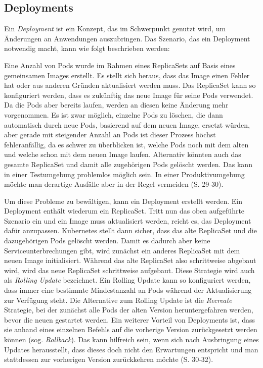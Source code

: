 \documentclass[11pt,a4paper]{article}
\begin{document}
\subsection{Deployments}
\label{sec:Deployments}
Ein \emph{Deployment} ist ein Konzept, das im Schwerpunkt genutzt wird, um Änderungen an Anwendungen auszubringen.
Das Szenario, das ein Deployment notwendig macht, kann wie folgt beschrieben werden:

Eine Anzahl von Pods wurde im Rahmen eines ReplicaSets auf Basis eines gemeinsamen Images erstellt.
Es stellt sich heraus, dass das Image einen Fehler hat oder aus anderen Gründen aktualisiert werden muss.
Das ReplicaSet kann so konfiguriert werden, dass es zukünftig das neue Image für seine Pods verwendet.
Da die Pods aber bereits laufen, werden an diesen keine Änderung mehr vorgenommen. Es ist zwar möglich,
einzelne Pods zu löschen, die dann automatisch durch neue Pods, basierend auf dem neuen Image, ersetzt würden, aber
gerade mit steigender Anzahl an Pods ist dieser Prozess höchst
fehleranfällig, da es schwer zu überblicken ist, welche Pods noch mit dem alten und welche schon mit dem
neuen Image laufen. Alternativ könnten auch das gesamte ReplicaSet und damit alle zugehörigen Pods gelöscht werden.
Das kann in einer Testumgebung problemlos möglich sein. In einer Produktivumgebung möchte man derartige
Ausfälle aber in der Regel vermeiden \cite{Schmeling_Dargatz_2022} (S. 29-30).

Um diese Probleme zu bewältigen, kann ein Deployment erstellt werden.
Ein Deployment enthält wiederum ein ReplicaSet. Tritt nun das oben aufgeführte Szenario ein und ein Image
muss aktualisiert werden, reicht es, das Deployment dafür anzupassen.
Kubernetes stellt dann sicher, dass das alte ReplicaSet und die dazugehörigen Pods gelöscht werden.
Damit es dadurch aber keine Serviceunterbrechungen gibt, wird zunächst ein anderes ReplicaSet mit dem neuen
Image initialisiert. Während das alte ReplicaSet also schrittweise abgebaut wird, wird das neue ReplicaSet
schrittweise aufgebaut. Diese Strategie wird auch als \emph{Rolling Update} bezeichnet.
Ein Rolling Update kann so konfiguriert werden, dass immer eine bestimmte Mindestanzahl an
Pods während der Aktualisierung zur Verfügung steht.
Die Alternative zum Rolling Update ist die \emph{Recreate} Strategie, bei der zunächst
alle Pods der alten Version heruntergefahren werden, bevor die neuen gestartet werden.
Ein weiterer Vorteil von Deployments ist, dass sie anhand eines einzelnen Befehls auf die vorherige Version
zurückgesetzt werden können (sog. \emph{Rollback}). Das kann hilfreich sein, wenn sich nach Ausbringung eines
Updates herausstellt, dass dieses doch nicht den Erwartungen entspricht und man stattdessen zur vorherigen
Version zurückkehren möchte \cite{Schmeling_Dargatz_2022} (S. 30-32).
\end{document}
